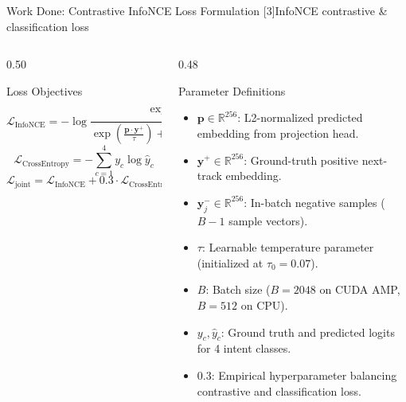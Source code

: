 \documentclass[aspectratio=169,10pt]{beamer}
\begin{document}
\begin{frame}{Work Done: Contrastive InfoNCE Loss Formulation [3]}{InfoNCE contrastive \& classification loss}
    \begin{columns}[T]
        \begin{column}{0.50\textwidth}
            \begin{block}{Loss Objectives}
                \fontsize{6.8pt}{8.8pt}\selectfont
                $$\mathcal{L}_{\text{InfoNCE}} = -\log \frac{\exp\left(\frac{\mathbf{p} \cdot \mathbf{y}^+}{\tau}\right)}{\exp\left(\frac{\mathbf{p} \cdot \mathbf{y}^+}{\tau}\right) + \sum_{j=1}^{B-1} \exp\left(\frac{\mathbf{p} \cdot \mathbf{y}_j^-}{\tau}\right)}$$
                $$\mathcal{L}_{\text{CrossEntropy}} = -\sum_{c=1}^4 y_c \log \hat{y}_c$$
                $$\mathcal{L}_{\text{joint}} = \mathcal{L}_{\text{InfoNCE}} + 0.3 \cdot \mathcal{L}_{\text{CrossEntropy}}$$
            \end{block}
        \end{column}

        \begin{column}{0.48\textwidth}
            \begin{block}{Parameter Definitions}
                \fontsize{6pt}{7.5pt}\selectfont
                \begin{itemize}
                    \item $\mathbf{p} \in \mathbb{R}^{256}$: L2-normalized predicted embedding from projection head.
                    \item $\mathbf{y}^+ \in \mathbb{R}^{256}$: Ground-truth positive next-track embedding.
                    \item $\mathbf{y}_j^- \in \mathbb{R}^{256}$: In-batch negative samples ($B-1$ sample vectors).
                    \item $\tau$: Learnable temperature parameter (initialized at $\tau_0=0.07$).
                    \item $B$: Batch size ($B=2048$ on CUDA AMP, $B=512$ on CPU).
                    \item $y_c, \hat{y}_c$: Ground truth and predicted logits for 4 intent classes.
                    \item $0.3$: Empirical hyperparameter balancing contrastive and classification loss.
                \end{itemize}
            \end{block}
        \end{column}
    \end{columns}
\end{frame}
\end{document}
